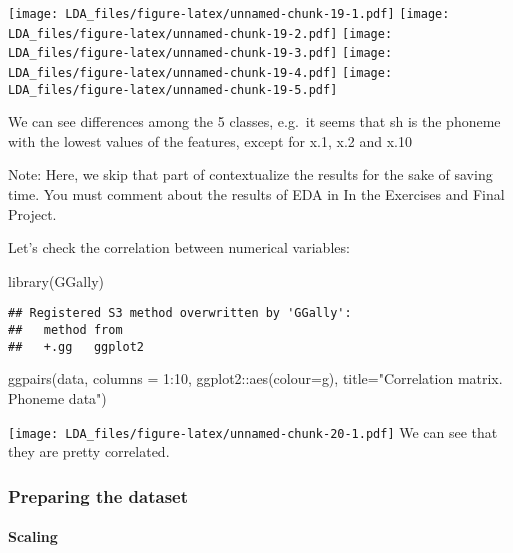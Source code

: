 \documentclass[
]{article}
\newenvironment{Shaded}{\begin{snugshade}}{\end{snugshade}}
\newcommand{\AttributeTok}[1]{\textcolor[rgb]{0.77,0.63,0.00}{#1}}
\newcommand{\DecValTok}[1]{\textcolor[rgb]{0.00,0.00,0.81}{#1}}
\newcommand{\FunctionTok}[1]{\textcolor[rgb]{0.00,0.00,0.00}{#1}}
\newcommand{\NormalTok}[1]{#1}
\newcommand{\SpecialCharTok}[1]{\textcolor[rgb]{0.00,0.00,0.00}{#1}}
\newcommand{\StringTok}[1]{\textcolor[rgb]{0.31,0.60,0.02}{#1}}
\begin{document}
\texttt{[image: LDA\_files/figure-latex/unnamed-chunk-19-1.pdf]}
\texttt{[image: LDA\_files/figure-latex/unnamed-chunk-19-2.pdf]}
\texttt{[image: LDA\_files/figure-latex/unnamed-chunk-19-3.pdf]}
\texttt{[image: LDA\_files/figure-latex/unnamed-chunk-19-4.pdf]}
\texttt{[image: LDA\_files/figure-latex/unnamed-chunk-19-5.pdf]}

We can see differences among the 5 classes, e.g.~it seems that sh is the
phoneme with the lowest values of the features, except for x.1, x.2 and
x.10

Note: Here, we skip that part of contextualize the results for the sake
of saving time. You must comment about the results of EDA in In the
Exercises and Final Project.

Let's check the correlation between numerical variables:

\begin{Shaded}
\begin{Highlighting}[]
\FunctionTok{library}\NormalTok{(GGally)}
\end{Highlighting}
\end{Shaded}

\begin{verbatim}
## Registered S3 method overwritten by 'GGally':
##   method from   
##   +.gg   ggplot2
\end{verbatim}

\begin{Shaded}
\begin{Highlighting}[]
\FunctionTok{ggpairs}\NormalTok{(data, }\AttributeTok{columns =} \DecValTok{1}\SpecialCharTok{:}\DecValTok{10}\NormalTok{, }
\NormalTok{        ggplot2}\SpecialCharTok{::}\FunctionTok{aes}\NormalTok{(}\AttributeTok{colour=}\NormalTok{g),}
        \AttributeTok{title=}\StringTok{"Correlation matrix. Phoneme data"}\NormalTok{)}
\end{Highlighting}
\end{Shaded}

\texttt{[image: LDA\_files/figure-latex/unnamed-chunk-20-1.pdf]} We can
see that they are pretty correlated.

\hypertarget{preparing-the-dataset}{%
\subsubsection{Preparing the dataset}\label{preparing-the-dataset}}

\hypertarget{scaling}{%
\paragraph{Scaling}\label{scaling}}
\end{document}
